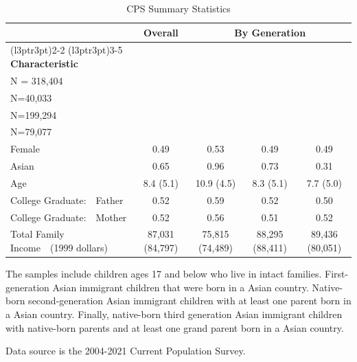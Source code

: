\documentclass[12pt,english]{article}
\begin{document}
\begin{landscape}
\begin{table}[H]
\centering
\caption{CPS Summary Statistics \label{tab:sumstat1}}
\centering
\begin{threeparttable}
\begin{tabular}[t]{lcccc}
\toprule
\multicolumn{1}{c}{ } & \multicolumn{1}{c}{\textbf{Overall}} & \multicolumn{3}{c}{\textbf{By Generation}} \\
\cmidrule(l{3pt}r{3pt}){2-2} \cmidrule(l{3pt}r{3pt}){3-5}
\textbf{Characteristic} & \makecell[c]{\textbf{All Sample} \\N = 318,404} & \makecell[c]{\textbf{First} \\N=40,033} & \makecell[c]{\textbf{Second} \\N=199,294} & \makecell[c]{\textbf{Third} \\N=79,077}\\
\midrule
Female & 0.49 & 0.53 & 0.49 & 0.49\\
Asian & 0.65 & 0.96 & 0.73 & 0.31\\
Age & 8.4 (5.1) & 10.9 (4.5) & 8.3 (5.1) & 7.7 (5.0)\\
College Graduate:\ \ 	 Father & 0.52 & 0.59 & 0.52 & 0.50\\
College Graduate:\ \ 	 Mother & 0.52 & 0.56 & 0.51 & 0.52\\
Total Family Income\ \ 	 (1999 dollars) & 87,031 (84,797) & 75,815 (74,489) & 88,295 (88,411) & 89,436 (80,051)\\
\bottomrule
\end{tabular}
\begin{tablenotes}
\item[1] The samples include children ages 17 and below who live in intact families. First-generation Asian immigrant children that were born in a Asian country. Native-born second-generation Asian immigrant children with at least one parent born in a Asian country. Finally, native-born third generation Asian immigrant children with native-born parents and at least one grand parent born in a Asian country.
\item[2] Data source is the 2004-2021 Current Population Survey.
\end{tablenotes}
\end{threeparttable}
\end{table}

\end{landscape}

\newpage
\pagebreak
\end{document}
